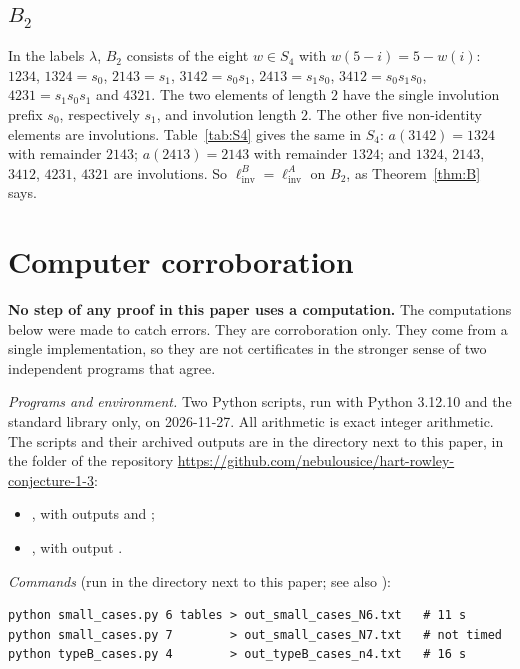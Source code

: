 \documentclass[11pt]{amsart}
\theoremstyle{definition}
\theoremstyle{remark}
\numberwithin{equation}{section}
\newcommand{\linv}{\ell_{\mathrm{inv}}}
\begin{document}
\subsection{\texorpdfstring{\(B_2\)}{B2}}
In the labels \(\lambda\), \(B_2\) consists of the eight \(w\in S_4\) with \(w(5-i)=5-w(i)\): \(1234\), \(1324=s_0\), \(2143=s_1\), \(3142=s_0s_1\), \(2413=s_1s_0\), \(3412=s_0s_1s_0\), \(4231=s_1s_0s_1\) and \(4321\). The two elements of length \(2\) have the single involution prefix \(s_0\), respectively \(s_1\), and involution length \(2\). The other five non-identity elements are involutions. Table~\ref{tab:S4} gives the same in \(S_4\): \(a(3142)=1324\) with remainder \(2143\); \(a(2413)=2143\) with remainder \(1324\); and \(1324\), \(2143\), \(3412\), \(4231\), \(4321\) are involutions. So \(\linv^B=\linv^A\) on \(B_2\), as Theorem~\ref{thm:B} says.

\section{Computer corroboration}\label{sec:computer}

\textbf{No step of any proof in this paper uses a computation.} The computations below were made to catch errors. They are corroboration only. They come from a single implementation, so they are not certificates in the stronger sense of two independent programs that agree.

\emph{Programs and environment.} Two Python scripts, run with Python 3.12.10 and the standard library only, on 2026-11-27. All arithmetic is exact integer arithmetic. The scripts and their archived outputs are in the directory  next to this paper, in the folder  of the repository \url{https://github.com/nebulousice/hart-rowley-conjecture-1-3}:
\begin{itemize}
\item {}, with outputs  and ;
\item {}, with output .
\end{itemize}

\emph{Commands} (run in the directory  next to this paper; see also ):
\begin{verbatim}
python small_cases.py 6 tables > out_small_cases_N6.txt   # 11 s
python small_cases.py 7        > out_small_cases_N7.txt   # not timed
python typeB_cases.py 4        > out_typeB_cases_n4.txt   # 16 s
\end{verbatim}
\end{document}
